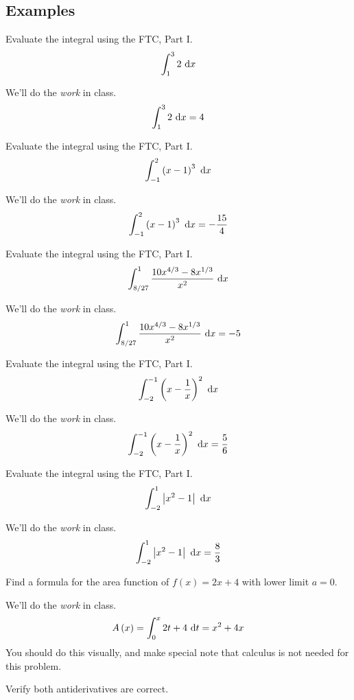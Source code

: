 \documentclass[12pt,addpoints, answers, fleqn]{exam}
\begin{document}
\subsection{Examples}

\begin{questions}
\question Evaluate the integral using the FTC, Part I.
\[
\int_1^3 2 \ {\rm{d}}x
\]
\begin{solution}
We'll do the \emph{work} in class.
\[
\int_1^3 2 \ {\rm{d}}x = 4
\]
\end{solution}

\question Evaluate the integral using the FTC, Part I.
\[
\int_{-1}^2 \left(x-1\right)^3 \ {\rm{d}}x
\]
\begin{solution}
We'll do the \emph{work} in class.
\[
\int_{-1}^2 \left(x-1\right)^3 \ {\rm{d}}x = -\frac{15}{4}
\]
\end{solution}

\question Evaluate the integral using the FTC, Part I.
\[
\int_{8/27}^1 \frac{10x^{4/3}-8x^{1/3}}{x^2} \ {\rm{d}}x
\]
\begin{solution}
We'll do the \emph{work} in class.
\[
\int_{8/27}^1 \frac{10x^{4/3}-8x^{1/3}}{x^2} \ {\rm{d}}x = -5
\]
\end{solution}

\question Evaluate the integral using the FTC, Part I.
\[
\int_{-2}^{-1} \left( x - \frac{1}{x}\right)^2 \ {\rm{d}}x
\]
\begin{solution}
We'll do the \emph{work} in class.
\[
\int_{-2}^{-1} \left( x - \frac{1}{x}\right)^2 \ {\rm{d}}x = \frac{5}{6}
\]
\end{solution}

\question Evaluate the integral using the FTC, Part I.
\[
\int_{-2}^1 \left| x^2 - 1 \right| \ {\rm{d}}x
\]
\begin{solution}
We'll do the \emph{work} in class.
\[
\int_{-2}^1 \left| x^2 - 1 \right| \ {\rm{d}}x = \frac{8}{3}
\]
\end{solution}

\question Find a formula for the area function of $f\left(x\right) = 2x + 4$ with lower limit $a=0$.

\begin{solution}
We'll do the \emph{work} in class.
\[
A \left( x \right)= \int_{0}^{x} 2t+4 \ {\rm{d}}t = x^2 + 4x
\]
You should do this visually, and make special note that calculus is not needed for this problem.
\end{solution}

\question Verify both antiderivatives are correct.


\end{questions}
\end{document}
